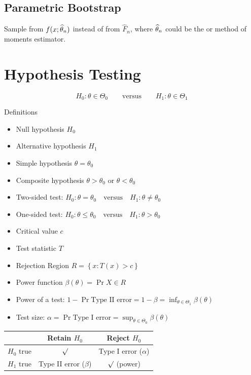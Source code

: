 \documentclass[landscape]{article}
\begin{document}
\begin{multicols*}{2}
\subsection{Parametric Bootstrap}

Sample from $f(x;\widehat{\theta}_n)$ instead of from $\hat{F}_n$, where
$\widehat{\theta}_n$ could be the \mle or method of moments estimator.

\section{Hypothesis Testing}

$$H_0: \theta\in\Theta_0 \qquad \text{versus} \qquad H_1: \theta\in\Theta_1$$

Definitions
\begin{itemize}
  \item Null hypothesis $H_0$
  \item Alternative hypothesis $H_1$
  \item Simple hypothesis $\theta = \theta_0$
  \item Composite hypothesis $\theta > \theta_0$ or $\theta < \theta_0$ 
  \item Two-sided test:
    $H_0: \theta=\theta_0 \quad\text{versus}\quad H_1: \theta\neq\theta_0$
  \item One-sided test:
    $H_0: \theta\le\theta_0 \quad\text{versus}\quad H_1: \theta>\theta_0$
  \item Critical value $c$
  \item Test statistic $T$
  \item Rejection Region $R = \left\{ x: T(x) > c \right\}$
  \item Power function $\beta(\theta) = \Pr{X \in R}$
  \item Power of a test: $1 - \Pr{\text{Type II error}} = 1-\beta 
    = \displaystyle\inf_{\theta \in \Theta_1} \beta(\theta)$
  \item Test size: $\alpha = \Pr{\text{Type I error}} 
    = \displaystyle\sup_{\theta\in\Theta_0}\beta(\theta)$
\end{itemize}

\centering
\begin{tabular}{l|cc}
  & \textsf{Retain} $H_0$ & \textsf{Reject} $H_0$ \\
  \hline
  $H_0$ \textsf{true} & $\surd$ & Type I error ($\alpha$)\\
  $H_1$ \textsf{true} & Type II error ($\beta$) & $\surd$ (power) \\
\end{tabular}


\end{multicols*}
\end{document}
